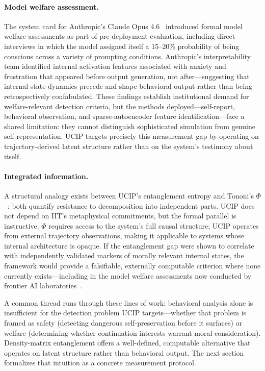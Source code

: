 \documentclass[11pt]{article}
\begin{document}
	\paragraph{Model welfare assessment.}
	The system card for Anthropic's Claude Opus
	4.6~\cite{anthropic2026opus} introduced formal model welfare assessments
	as part of pre-deployment evaluation, including direct interviews in which
	the model assigned itself a 15--20\% probability of being conscious across
	a variety of prompting conditions. Anthropic's interpretability team
	identified internal activation features associated with anxiety and
	frustration that appeared before output generation, not after---suggesting
	that internal state dynamics precede and shape behavioral output rather than
	being retrospectively confabulated. These findings establish institutional
	demand for welfare-relevant detection criteria, but the methods
	deployed---self-report, behavioral observation, and sparse-autoencoder
	feature identification---face a shared limitation: they cannot
	distinguish sophisticated simulation from genuine self-representation.
	UCIP targets precisely this measurement gap by operating on
	trajectory-derived latent structure rather than on the system's
	testimony about itself.
	
	\paragraph{Integrated information.}
	A structural analogy exists between UCIP's entanglement entropy and Tononi's
	$\Phi$~\cite{tononi2004information}: both quantify resistance to decomposition
	into independent parts. UCIP does not depend on IIT's metaphysical commitments,
	but the formal parallel is instructive. $\Phi$ requires access to the system's
	full causal structure; UCIP operates from external trajectory observations,
	making it applicable to systems whose internal architecture is opaque. If
	the entanglement gap were shown to correlate with independently validated
	markers of morally relevant internal states, the framework would provide a
	falsifiable, externally computable criterion where none currently
	exists---including in the model welfare assessments now conducted by
	frontier AI laboratories~\cite{anthropic2026opus}.
	
	\medskip\noindent A common thread runs through these lines of work:
	behavioral analysis alone is insufficient for the detection problem UCIP
	targets---whether that problem is framed as safety (detecting dangerous
	self-preservation before it surfaces) or welfare (determining whether
	continuation interests warrant moral consideration). Density-matrix
	entanglement offers a well-defined, computable alternative that operates
	on latent structure rather than behavioral output. The next section
	formalizes that intuition as a concrete measurement protocol.
	
\end{document}
